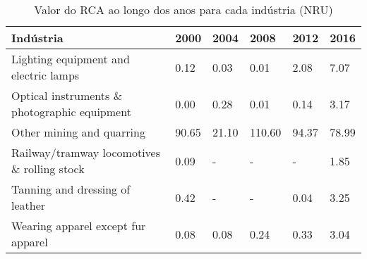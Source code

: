 \begin{table}
\centering
\caption{Valor do RCA ao longo dos anos para cada indústria (NRU)}
\begin{tabular}{p{6cm}p{1.5cm}p{1.5cm}p{1.5cm}p{1.5cm}p{1.5cm}}
\toprule
                                   Indústria &  2000 &  2004 &   2008 &  2012 &  2016 \\
\midrule
       Lighting equipment and electric lamps &  0.12 &  0.03 &   0.01 &  2.08 &  7.07 \\
Optical instruments \& photographic equipment &  0.00 &  0.28 &   0.01 &  0.14 &  3.17 \\
                   Other mining and quarring & 90.65 & 21.10 & 110.60 & 94.37 & 78.99 \\
 Railway/tramway locomotives \& rolling stock &  0.09 &     - &      - &     - &  1.85 \\
             Tanning and dressing of leather &  0.42 &     - &      - &  0.04 &  3.25 \\
          Wearing apparel except fur apparel &  0.08 &  0.08 &   0.24 &  0.33 &  3.04 \\
\bottomrule
\end{tabular}
\end{table}
